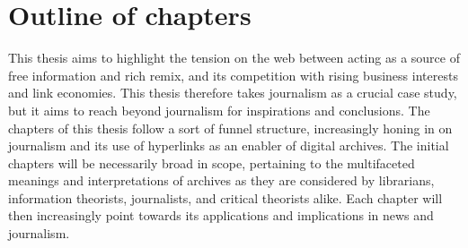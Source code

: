 




\section{Outline of chapters}


This thesis aims to highlight the tension on the web between acting as a source of free information and rich remix, and its competition with rising business interests and link economies. This thesis therefore takes journalism as a crucial case study, but it aims to reach beyond journalism for inspirations and conclusions. The chapters of this thesis follow a sort of funnel structure, increasingly honing in on journalism and its use of hyperlinks as an enabler of digital archives. The initial chapters will be necessarily broad in scope, pertaining to the multifaceted meanings and interpretations of archives as they are considered by librarians, information theorists, journalists, and critical theorists alike. Each chapter will then increasingly point towards its applications and implications in news and journalism.

